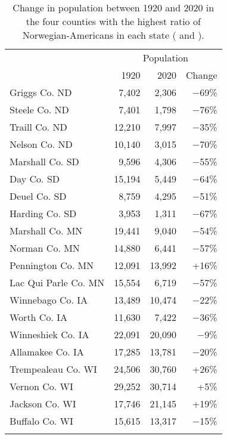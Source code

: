 \documentclass[output=paper]{langscibook}
\begin{document}
\begin{table}
\begin{tabular}{l rrr}
\lsptoprule
              & \multicolumn{3}{c}{Population}\\\cmidrule(lr){2-4}
              & 1920 & 2020 & Change\\\midrule
Griggs Co. ND & 7,402 & 2,306 & −69\%\\
Steele Co. ND & 7,401 & 1,798 & −76\%\\
Traill Co. ND & 12,210 & 7,997 & −35\%\\
Nelson Co. ND & 10,140 & 3,015 & −70\%\\
Marshall Co. SD & 9,596 & 4,306 & −55\%\\
Day Co. SD & 15,194 & 5,449 & −64\%\\
Deuel Co. SD & 8,759 & 4,295 & −51\%\\
Harding Co. SD & 3,953 & 1,311 & −67\%\\
Marshall Co. MN & 19,441 & 9,040 & −54\%\\
Norman Co. MN & 14,880 & 6,441 & −57\%\\
Pennington Co. MN & 12,091 & 13,992 & +16\%\\
Lac Qui Parle Co. MN & 15,554 & 6,719 & −57\%\\
Winnebago Co. IA & 13,489 & 10,474 & −22\%\\
Worth Co. IA & 11,630 & 7,422 & −36\%\\
Winneshiek Co. IA & 22,091 & 20,090 & −9\%\\
Allamakee Co. IA & 17,285 & 13,781 & −20\%\\
Trempealeau Co. WI & 24,506 & 30,760 & +26\%\\
Vernon Co. WI & 29,252 & 30,714 & +5\%\\
Jackson Co. WI & 17,746 & 21,145 & +19\%\\
Buffalo Co. WI & 15,615 & 13,317 & −15\%\\
\lspbottomrule
\end{tabular}
\caption{Change in population between 1920 and 2020 in the four counties with the highest ratio of Norwegian\hyp Americans in each state (\citealt{DepartmentCommerce1921} and \citealt{USCensus2020}).}
\label{tab:hjelde:3}
\end{table}
\end{document}
